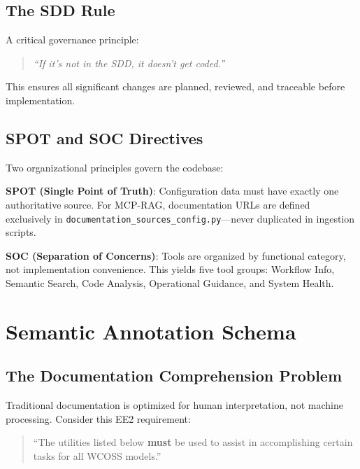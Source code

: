 \documentclass[11pt,letterpaper]{article}
\begin{document}
\subsection{The SDD Rule}

A critical governance principle:

\begin{quote}
    \textit{``If it's not in the SDD, it doesn't get coded.''}
\end{quote}

This ensures all significant changes are planned, reviewed, and traceable before implementation.

\subsection{SPOT and SOC Directives}

Two organizational principles govern the codebase:

\textbf{SPOT (Single Point of Truth)}: Configuration data must have exactly one authoritative source. For MCP-RAG, documentation URLs are defined exclusively in \texttt{documentation\_sources\_config.py}---never duplicated in ingestion scripts.

\textbf{SOC (Separation of Concerns)}: Tools are organized by functional category, not implementation convenience. This yields five tool groups: Workflow Info, Semantic Search, Code Analysis, Operational Guidance, and System Health.

\section{Semantic Annotation Schema}

\subsection{The Documentation Comprehension Problem}

Traditional documentation is optimized for human interpretation, not machine processing. Consider this EE2 requirement:

\begin{quote}
    ``The utilities listed below \textbf{must} be used to assist in accomplishing certain tasks for all WCOSS models.''
\end{quote}
\end{document}
